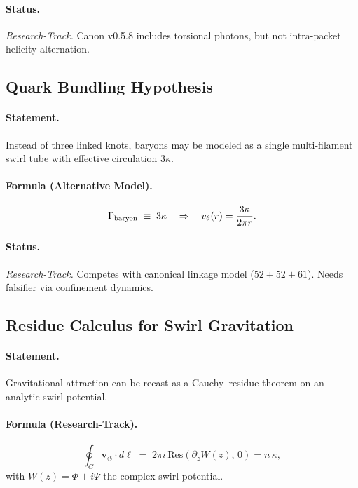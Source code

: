 \paragraph{Status.} \emph{Research-Track.} Canon v0.5.8 includes torsional photons, but not
    intra-packet helicity alternation.

\subsection{Quark Bundling Hypothesis}
\paragraph{Statement.}
    Instead of three linked knots, baryons may be modeled as a single multi-filament swirl tube
    with effective circulation $3\kappa$.

\paragraph{Formula (Alternative Model).}
    \[
        \Gamma_{\rm baryon} \;\equiv\; 3\kappa
        \quad\Rightarrow\quad
        v_\theta(r) = \frac{3\kappa}{2\pi r}.
    \]

\paragraph{Status.} \emph{Research-Track.} Competes with canonical linkage model
    ($52+52+61$). Needs falsifier via confinement dynamics.

\subsection{Residue Calculus for Swirl Gravitation}
\paragraph{Statement.}
    Gravitational attraction can be recast as a Cauchy–residue theorem on an analytic swirl potential.

\paragraph{Formula (Research-Track).}
    \[
        \oint_C \mathbf{v}_{\!\boldsymbol{\circlearrowleft}} \cdot d\ell
        \;=\; 2\pi i\,\mathrm{Res}\!\left(\partial_z W(z),\,0\right)
        = n\,\kappa,
    \]
    with $W(z)=\Phi+i\Psi$ the complex swirl potential.

